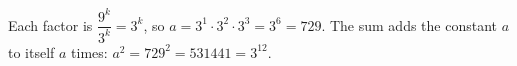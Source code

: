 Each factor is $\dfrac{9^k}{3^k}=3^k$, so $a=3^1\cdot3^2\cdot3^3=3^6=729$. The sum adds the constant $a$ to itself $a$ times: $a^2=729^2=\boxed{531441}=3^{12}$.
